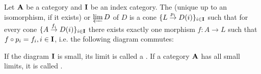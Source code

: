 \begin{definition}\label{def:categorical_limit}\cite[definitions 5.1.19(b), definition 6.3.6]{Leinster2014}
  Let \( \operatorname{\mathbf{A}} \) be a category and \( \operatorname{\mathbf{I}} \) be an index category. The (unique up to an isomorphism, if it exists)  or  \( \varprojlim D \) of \( D \) is a cone \( \{ L \overset {p_i} \to D(i) \}_{i \in \operatorname{\mathbf{I}}} \) such that for every cone \( \{ A \overset {f_i} \to D(i) \}_{i \in \operatorname{\mathbf{I}}} \) there exists exactly one morphism \( f: A \to L \) such that \( f \circ p_i = f_i, i \in \operatorname{\mathbf{I}} \), i.e. the following diagram commutes:
  \begin{Center}
  \end{Center}

  If the diagram \( \operatorname{\mathbf{I}} \) is small, its limit is called a . If a category \( \operatorname{\mathbf{A}} \) has all small limits, it is called .
\end{definition}


